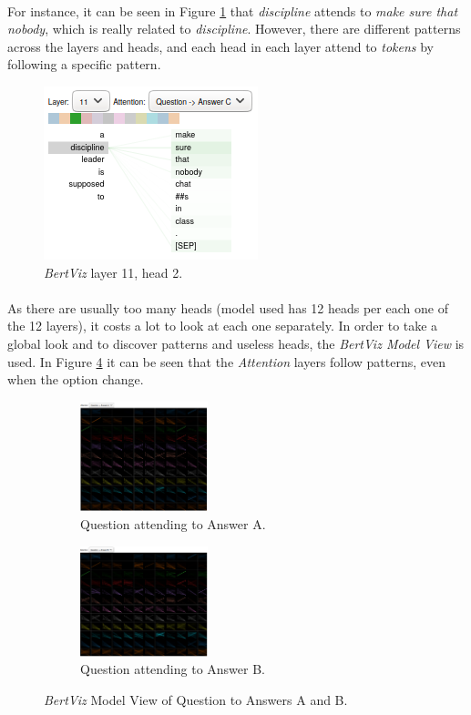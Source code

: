 \paragraph{}
For instance, it can be seen in Figure \ref{fig:bertviz-l11h2} that \emph{discipline} attends to \emph{make sure that nobody}, which is really related to \emph{discipline}. However, there are different patterns across the layers and heads, and each head in each layer attend to \emph{tokens} by following a specific pattern. 
\begin{figure}[!h]
	\centering
	\includegraphics[scale=0.4]{images/bertviz-question-l11-head2}
	\caption{\emph{BertViz} layer 11, head 2.}
	\label{fig:bertviz-l11h2}
\end{figure}
\paragraph{}
As there are usually too many heads (model used has 12 heads per each one of the 12 layers), it costs a lot to look at each one separately. In order to take a global look and to discover patterns and useless heads, the \emph{BertViz Model View} is used. In Figure \ref{fig:bertviz-model-q} it can be seen that the \emph{Attention} layers follow patterns, even when the option change.
\begin{figure}[!h]
\centering
\begin{subfigure}{0.4\textwidth}
  \centering
	\includegraphics[width=140px]{images/bertviz-model-a}
	\caption{Question attending to Answer A.}
	\label{fig:bertviz-model-q-aa}
\end{subfigure}
\medskip 
\begin{subfigure}{0.4\textwidth}
  \centering
	\includegraphics[width=140px]{images/bertviz-model-b}
	\caption{Question attending to Answer B.}
	\label{fig:bertviz-model-q-ab}
\end{subfigure}
\caption{\emph{BertViz} Model View of Question to Answers A and B.}
\label{fig:bertviz-model-q}
\end{figure}
